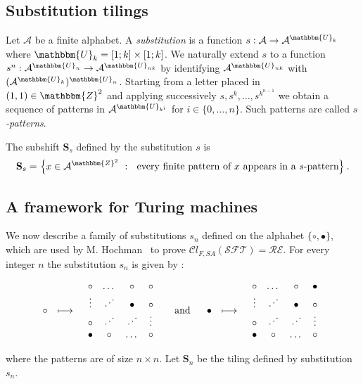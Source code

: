 \documentclass[proceedings]{stacs}
\theoremstyle{plain}\newtheorem{satz}[thm]{Satz}
\theoremstyle{definition}\newtheorem{crucial}[thm]{Crucial Definition}
\newcommand{\U}{\mathbbm{U}}
\newcommand{\A}{\mathcal{A}}
\newcommand{\Sub}{\mathbf{S}}
\newcommand{\SFT}{\mathcal{SFT}}
\newcommand{\reshift}{\mathcal{RE}}
\begin{document}
	\subsection{Substitution tilings}

Let $\A$ be a finite alphabet. A \emph{substitution} is a function $s:\A\rightarrow \A^{\U_k}$ where  $\U_k=[1;k]\times[1;k]$. We naturally extend $s$ to a function $s^n : \A^{\U_n} \rightarrow \A^{\U_{nk}}$ by identifying $\A^{\U_{nk}}$ with $(\A^{\U_{k}})^{\U_n}$.
Starting from a letter placed in $(1,1)\in\mathbbm{Z}^2$ and applying successively $s,s^k,\dots,s^{k^{n-1}}$ we obtain a sequence of patterns in $\A^{\U_{k^i}}$ for $i\in\{0,\dots, n\}$. Such patterns are called \emph{$s$-patterns}.

\begin{definition}
The subshift $\Sub_s$ defined by the substitution $s$ is
$$\Sub_s=\left\{ x\in\A^{\mathbbm{Z}^2}\ : \ \textrm{ every finite pattern of }x\textrm{ appears in a $s$-pattern} \right\}.$$
\end{definition}


	\subsection{A framework for Turing machines}

We now describe a family of substitutions $s_n$ defined on the alphabet $\{ \circ,\bullet\}$, which are used by M. Hochman~\cite{hochman2007drp} to prove $\mathcal{C}l_{F,SA}(\SFT)=\reshift$. For every integer $n$ the substitution $s_n$ is given by :
\begin{tiny}
$$
\begin{array}{ccccccc}
\circ
&
\longmapsto
& 
\begin{array}{cccc}
\circ & \dots & \circ & \circ\\
\vdots & \adots & \bullet & \circ\\
\circ & \adots & \adots & \vdots\\
\bullet & \circ & \dots & \circ 
\end{array}
&
\text{ \normalsize{ and } }
&
\bullet
&
\longmapsto
&
\begin{array}{cccc}
\circ & \dots & \circ & \bullet\\
\vdots & \adots & \bullet & \circ\\
\circ & \adots & \adots & \vdots\\
\bullet & \circ & \dots & \circ 
\end{array}
\end{array}
$$
\end{tiny}
where the patterns are of size $n\times n$. Let $\Sub_n$ be the tiling defined by substitution $s_n$.
\end{document}
